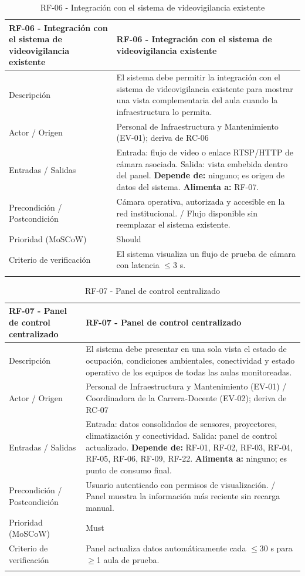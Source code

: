 \begingroup
\small
\begin{longtable}{|P{0.5000}|P{0.5000}|}
\hline
RF-06 - Integración con el sistema de videovigilancia existente & RF-06 - Integración con el sistema de videovigilancia existente \\ \hline
Descripción & El sistema debe permitir la integración con el sistema de videovigilancia existente para mostrar una vista complementaria del aula cuando la infraestructura lo permita. \\ \hline
Actor / Origen & Personal de Infraestructura y Mantenimiento (EV-01); deriva de RC-06 \\ \hline
Entradas / Salidas & Entrada: flujo de video o enlace RTSP/HTTP de cámara asociada. Salida: vista embebida dentro del panel. \textbf{Depende de:} ninguno; es origen de datos del sistema. \textbf{Alimenta a:} RF-07. \\ \hline
Precondición / Postcondición & Cámara operativa, autorizada y accesible en la red institucional. / Flujo disponible sin reemplazar el sistema existente. \\ \hline
Prioridad (MoSCoW) & Should \\ \hline
Criterio de verificación & El sistema visualiza un flujo de prueba de cámara con latencia $\leq$3 s. \\ \hline
\caption{RF-06 - Integración con el sistema de videovigilancia existente}
\end{longtable}
\endgroup

\begingroup
\small
\begin{longtable}{|P{0.5000}|P{0.5000}|}
\hline
RF-07 - Panel de control centralizado & RF-07 - Panel de control centralizado \\ \hline
Descripción & El sistema debe presentar en una sola vista el estado de ocupación, condiciones ambientales, conectividad y estado operativo de los equipos de todas las aulas monitoreadas. \\ \hline
Actor / Origen & Personal de Infraestructura y Mantenimiento (EV-01) / Coordinadora de la Carrera-Docente (EV-02); deriva de RC-07 \\ \hline
Entradas / Salidas & Entrada: datos consolidados de sensores, proyectores, climatización y conectividad. Salida: panel de control actualizado. \textbf{Depende de:} RF-01, RF-02, RF-03, RF-04, RF-05, RF-06, RF-09, RF-22. \textbf{Alimenta a:} ninguno; es punto de consumo final. \\ \hline
Precondición / Postcondición & Usuario autenticado con permisos de visualización. / Panel muestra la información más reciente sin recarga manual. \\ \hline
Prioridad (MoSCoW) & Must \\ \hline
Criterio de verificación & Panel actualiza datos automáticamente cada $\leq$30 s para $\geq$1 aula de prueba. \\ \hline
\caption{RF-07 - Panel de control centralizado}
\end{longtable}
\endgroup

